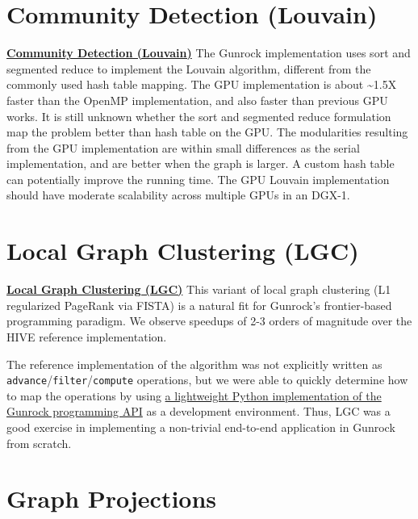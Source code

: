 \documentclass[10pt,oneside]{memoir}
\begin{document}
\hypertarget{community-detection-louvain}{%
\section{Community Detection
(Louvain)}\label{community-detection-louvain}}

\textbf{\href{https://gunrock.github.io/docs/hive_louvain.html}{Community
Detection (Louvain)}} The Gunrock implementation uses sort and segmented
reduce to implement the Louvain algorithm, different from the commonly
used hash table mapping. The GPU implementation is about
\textasciitilde{}1.5X faster than the OpenMP implementation, and also
faster than previous GPU works. It is still unknown whether the sort and
segmented reduce formulation map the problem better than hash table on
the GPU. The modularities resulting from the GPU implementation are
within small differences as the serial implementation, and are better
when the graph is larger. A custom hash table can potentially improve
the running time. The GPU Louvain implementation should have moderate
scalability across multiple GPUs in an DGX-1.

\hypertarget{local-graph-clustering-lgc}{%
\section{Local Graph Clustering
(LGC)}\label{local-graph-clustering-lgc}}

\textbf{\href{https://gunrock.github.io/docs/hive_pr_nibble.html}{Local
Graph Clustering (LGC)}} This variant of local graph clustering (L1
regularized PageRank via FISTA) is a natural fit for Gunrock's
frontier-based programming paradigm. We observe speedups of 2-3 orders
of magnitude over the HIVE reference implementation.

The reference implementation of the algorithm was not explicitly written
as \texttt{advance}/\texttt{filter}/\texttt{compute} operations, but we
were able to quickly determine how to map the operations by using
\href{https://github.com/gunrock/pygunrock/blob/master/apps/pr_nibble.py}{a
lightweight Python implementation of the Gunrock programming API} as a
development environment. Thus, LGC was a good exercise in implementing a
non-trivial end-to-end application in Gunrock from scratch.

\hypertarget{graph-projections}{%
\section{Graph Projections}\label{graph-projections}}
\end{document}
